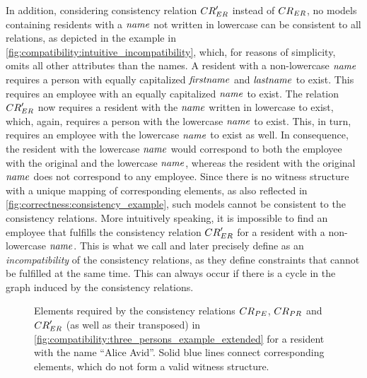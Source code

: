 In addition, considering consistency relation $\consistencyrelation{CR}{ER}'$ instead of $\consistencyrelation{CR}{ER}$, no models containing residents with a $\mathit{name}$ not written in lowercase can be consistent to all relations, as depicted in the example in \autoref{fig:compatibility:intuitive_incompatibility}, which, for reasons of simplicity, omits all other attributes than the names.
A resident with a non-lowercase $\mathit{name}$ requires a person with equally capitalized $\mathit{firstname}$ and $\mathit{lastname}$ to exist.
This requires an employee with an equally capitalized $\mathit{name}$ to exist.
The relation $\consistencyrelation{CR}{ER}'$ now requires a resident with the $\mathit{name}$ written in lowercase to exist, which, again, requires a person with the lowercase $\mathit{name}$ to exist.
This, in turn, requires an employee with the lowercase $\mathit{name}$ to exist as well.
In consequence, the resident with the lowercase $\mathit{name}$ would correspond to both the employee with the original and the lowercase $\mathit{name}$, whereas the resident with the original $\mathit{name}$ does not correspond to any employee.
Since there is no witness structure with a unique mapping of corresponding elements, as also reflected in \autoref{fig:correctness:consistency_example}, such models cannot be consistent to the consistency relations.
More intuitively speaking, it is impossible to find an employee that fulfills the consistency relation $\consistencyrelation{CR}{ER}'$ for a resident with a non-lowercase $\mathit{name}$.
This is what we call and later precisely define as an \emph{incompatibility} of the consistency relations, as they define constraints that cannot be fulfilled at the same time.
This can always occur if there is a cycle in the graph induced by the consistency relations.

\begin{figure}
    \centering
    
    \caption[Example for an intuitive notion of incompatibility]{Elements required by the consistency relations $\consistencyrelation{CR}{PE}$, $\consistencyrelation{CR}{PR}$ and $\consistencyrelation{CR}{ER}'$ (as well as their transposed) in \autoref{fig:compatibility:three_persons_example_extended} for a resident with the name \enquote{Alice Avid}. Solid blue lines connect corresponding elements, which do not form a valid witness structure.}
    \label{fig:compatibility:intuitive_incompatibility}
\end{figure}

